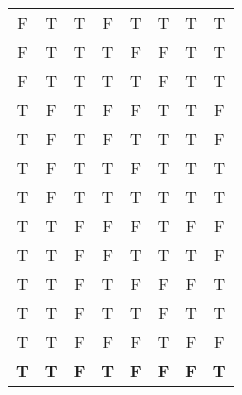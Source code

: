 \documentclass{article}
\begin{document}
\begin{landscape}
\begin{tabular}{|c|c|c|c|c|c|c|c|}
        F          & T          & T          & F          & T          & T                        & T                        & T                                \\
        F          & T          & T          & T          & F          & F                        & T                        & T                                \\
        F          & T          & T          & T          & T          & F                        & T                        & T                                \\
        T          & F          & T          & F          & F          & T                        & T                        & F                                \\
        T          & F          & T          & F          & T          & T                        & T                        & F                                \\
        T          & F          & T          & T          & F          & T                        & T                        & T                                \\
        T          & F          & T          & T          & T          & T                        & T                        & T                                \\
        T          & T          & F          & F          & F          & T                        & F                        & F                                \\
        T          & T          & F          & F          & T          & T                        & T                        & F                                \\
        T          & T          & F          & T          & F          & F                        & F                        & T                                \\
        T          & T          & F          & T          & T          & F                        & T                        & T                                \\
        \hline
        T          & T          & F          & F          & F          & T                        & F                        & F                                \\
        \textbf{T} & \textbf{T} & \textbf{F} & \textbf{T} & \textbf{F} & \textbf{F}               & \textbf{F}               & \textbf{T}                       \\
        \hline
    \end{tabular}\\
    \normalsize

\end{landscape}
\end{document}
